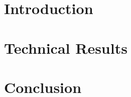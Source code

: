 \documentclass[11pt]{article}
\title{}
\author{Matthew Morton}
\date{}
\begin{document}
\linespread{1.15}

\hrulefill

\tableofcontents

\hrulefill

\clearpage

\section{Introduction}



\clearpage

\section{Technical Results}



\clearpage

\section{Conclusion}



\clearpage

\printbibliography[heading=bibintoc, title=References]{}
\end{document}
